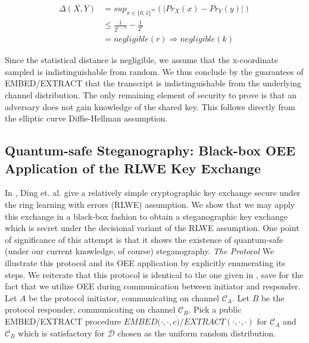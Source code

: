\documentclass{article}
\begin{document}
\begin{align*}
\Delta(X,Y) &= sup_{x \in \{0,1\}^m}(\lvert Pr_X(x) - Pr_Y(y) \rvert) \\
&\leq \frac{1}{2^{r-5}} - \frac{1}{2 ^r} \\
&= negligible(r) \Rightarrow negligible(k)
\end{align*}

\noindent Since the statistical distance is negligible, we assume that the x-coordinate 
sampled is indistinguishable from random.  We thus conclude by the guarantees of EMBED/EXTRACT
that the transcript is indistinguishable from the underlying channel distribution.
\newline\newline
\noindent The only remaining element of security to prove is that an adversary does not 
gain knowledge of the shared key.  This follows directly from the elliptic curve Diffie-Hellman 
assumption.

\subsection{Quantum-safe Steganography: Black-box OEE Application of the RLWE Key Exchange}

In \cite{RLWE}, Ding et. al. give a relatively simple cryptographic key exchange secure 
under the ring learning with errors (RLWE) assumption.  We show that we may apply this 
exchange in a black-box fashion to obtain a steganographic key exchange which is secret 
under the decisional variant of the RLWE assumption.  One point of significance of this 
attempt is that it shows the existence of quantum-safe (under our current knowledge, of course)
steganography.
\newline\newline
\noindent \textit{The Protocol } We illustrate this protocol and its OEE application by 
explicitly enumerating its steps.  We reiterate that this protocol is identical to the one 
given in \cite{RLWE}, save for the fact that we utilize OEE during communication between initiator 
and responder.
\newline\newline
Let $A$ be the protocol initiator, communicating on channel $\mathcal{C}_A$.  
Let $B$ be the protocol responder, communicating on channel $\mathcal{C}_B$.  Pick a 
public EMBED/EXTRACT procedure $EMBED(\cdot,\cdot, c\dot)/EXTRACT(\cdot, \cdot, \cdot)$ 
for $\mathcal{C}_A$ and $\mathcal{C}_B$ which is satisfactory for $\mathcal{D}$ chosen as the 
uniform random distribution.
\end{document}
